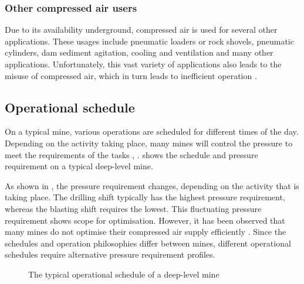 \subsubsection{Other compressed air users}
Due to its availability underground, compressed air is used for several other applications. These usages include pneumatic loaders or rock shovels, pneumatic cylinders, dam sediment agitation, cooling and ventilation and many other applications. Unfortunately, this vast variety of applications also leads to the misuse of compressed air, which in turn leads to inefficient operation \cite{Marais2012PhD}.
\subsection{Operational schedule}
On a typical mine, various operations are scheduled for different times of the day. Depending on the activity taking place, many mines will control the pressure to meet the requirements of the tasks \cite{Marais2012PhD}, \cite{Kriel2014Masters}.  shows the schedule and pressure requirement on a typical deep-level mine.
\par 
As shown in , the pressure requirement changes, depending on the activity that is taking place. The drilling shift typically has the highest pressure requirement, whereas the blasting shift requires the lowest. This fluctuating pressure requirement shows scope for optimisation. However, it has been observed that many mines do not optimise their compressed air supply efficiently \cite{padachi2009energy}.
Since the schedules and operation philosophies differ between mines, different operational schedules require alternative pressure requirement profiles.
\par 
\begin{figure}[!htbp]
	\centering
	\fbox{}
	\caption[A typical operational schedule of a deep-level mine]{The typical operational schedule of a deep-level mine \cite{Kriel2014Masters}}
	\label{fig: Mining schedule}
\end{figure}
